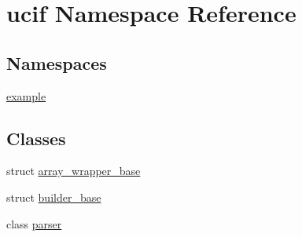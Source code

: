 \hypertarget{namespaceucif}{\section{ucif Namespace Reference}
\label{namespaceucif}
}
\subsection*{Namespaces}
\begin{DoxyCompactItemize}
\item 
\hyperlink{namespaceucif_1_1example}{example}
\end{DoxyCompactItemize}
\subsection*{Classes}
\begin{DoxyCompactItemize}
\item 
struct \hyperlink{structucif_1_1array__wrapper__base}{array\-\_\-wrapper\-\_\-base}
\item 
struct \hyperlink{structucif_1_1builder__base}{builder\-\_\-base}
\item 
class \hyperlink{classucif_1_1parser}{parser}
\end{DoxyCompactItemize}
